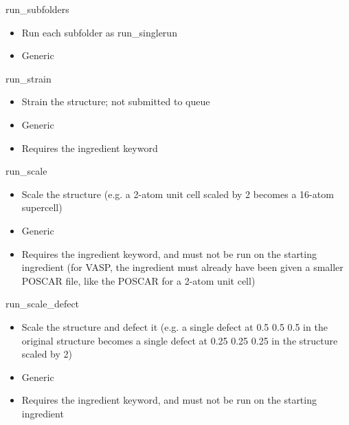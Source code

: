 \documentclass[letterpaper,10pt,english]{sphinxmanual}
\begin{document}
run\_subfolders
\begin{itemize}
\item {} 
Run each subfolder as run\_singlerun

\item {} 
Generic

\end{itemize}

run\_strain
\begin{itemize}
\item {} 
Strain the structure; not submitted to queue

\item {} 
Generic

\item {} 
Requires the  ingredient keyword

\end{itemize}

run\_scale
\begin{itemize}
\item {} 
Scale the structure (e.g. a 2-atom unit cell scaled by 2 becomes a 16-atom supercell)

\item {} 
Generic

\item {} 
Requires the  ingredient keyword, and must not be run on the starting ingredient (for VASP, the ingredient must already have been given a smaller POSCAR file, like the POSCAR for a 2-atom unit cell)

\end{itemize}

run\_scale\_defect
\begin{itemize}
\item {} 
Scale the structure and defect it (e.g. a single defect at 0.5 0.5 0.5 in the original structure becomes a single defect at 0.25 0.25 0.25 in the structure scaled by 2)

\item {} 
Generic

\item {} 
Requires the  ingredient keyword, and must not be run on the starting ingredient

\end{itemize}
\end{document}
